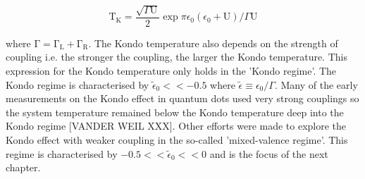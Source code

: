 \begin{equation}\label{eq:kondo_temp}
  \mathrm{T_K} = 
  \frac{\sqrt{\Gamma \mathrm{U}}}{2}
  \exp{\pi \epsilon_0 (\epsilon_0 + \mathrm{U})/\Gamma\mathrm{U}}
\end{equation}

where $\mathrm{\Gamma = \Gamma_L + \Gamma_R}$. The Kondo temperature also depends on the strength of coupling i.e. the stronger the coupling, the larger the Kondo temperature. This expression for the Kondo temperature only holds in the 'Kondo regime'. The Kondo regime is characterised by $\tilde{\epsilon}_0<<-0.5$ where $\tilde{\epsilon}\equiv \epsilon_0/\Gamma$. Many of the early measurements on the Kondo effect in quantum dots used very strong couplings so the system temperature remained below the Kondo temperature deep into the Kondo regime [VANDER WEIL XXX]. Other efforts were made to explore the Kondo effect with weaker coupling in the so-called 'mixed-valence regime'. This regime is characterised by $-0.5<<\tilde{\epsilon}_0<<0$ and is the focus of the next chapter. 



